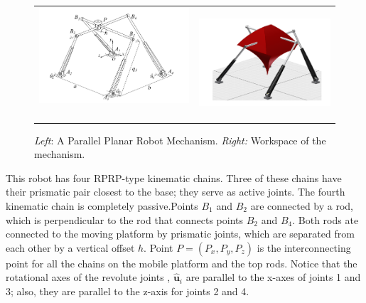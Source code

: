 \begin{figure}[tbph!]
	\centering
	\begin{tabular}{@{}c@{}c@{}}
		\includegraphics[width=0.50\linewidth ,height=0.4\columnwidth]{../lec_notes/figures/parallel_translational.png} \,\,
		&
		\includegraphics[width=0.48\columnwidth,height=0.4\columnwidth]{../lec_notes/figures/parallel_translational_workspace.png}
	\end{tabular}
	\caption{\textit{Left}: A Parallel Planar Robot Mechanism. \textit{Right:} Workspace of the mechanism.}
	\label{fig:para_mech}
\end{figure}

This robot has four RPRP-type kinematic chains. Three of these chains have their prismatic pair closest to the base; they serve as active joints. The fourth kinematic chain is completely passive.Points $B_1$ and $B_2$ are connected by a rod, which is perpendicular to the rod that connects points $B_2$ and $B_4$. Both rods ate connected to the moving platform by prismatic joints, which are separated from each other by a vertical offset $h$. Point $P = (P_x,P_y, P_z)$ is the interconnecting point for all the chains on the mobile platform and the top rods. Notice that the rotational axes of the revolute joints \ie, $\bm{\hat{u}}_i$ are parallel to the x-axes of joints 1 and 3; also, they are parallel to the z-axis for joints 2 and 4. 

